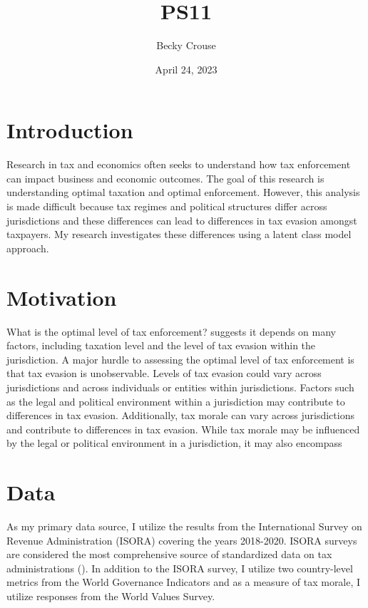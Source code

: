 \documentclass{MSword}
\title{PS11}
\author{Becky Crouse}
\date{April 24, 2023}
\begin{document}
\maketitle

\section*{Introduction}

Research in tax and economics often seeks to understand how tax enforcement can impact business and economic outcomes. The goal of this research is understanding optimal taxation and optimal enforcement. However, this analysis is made difficult because tax regimes and political structures differ across jurisdictions and these differences can lead to differences in tax evasion amongst taxpayers. My research investigates these differences using a latent class  model approach. 

\section*{Motivation}

What is the optimal level of tax enforcement? \cite{kaplow} suggests it depends on many factors, including taxation level and the level of tax evasion within the jurisdiction. A major hurdle to assessing the optimal level of tax enforcement is that tax evasion is unobservable. Levels of tax evasion could vary across jurisdictions and across individuals or entities within jurisdictions. Factors such as the legal and political environment within a jurisdiction may contribute to differences in tax evasion. Additionally, tax morale can vary across jurisdictions and contribute to differences in tax evasion. While tax morale may be influenced by the legal or political environment in a jurisdiction, it may also encompass 

\section*{Data}

As my primary data source, I utilize the results from the International Survey on Revenue Administration (ISORA) covering the years 2018-2020. ISORA surveys are considered the most comprehensive source of standardized data on tax administrations (\cite{isora}). In addition to the ISORA survey, I utilize two country-level metrics from the World Governance Indicators and as a measure of tax morale, I utilize responses from the World Values Survey. 
\end{document}
